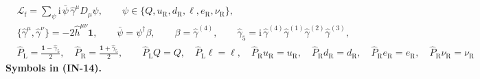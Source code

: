 \documentclass[
  10pt,
]{article}
\begin{document}
\[
\begin{aligned}
&\mathcal{L}_{\mathrm{f}} = \sum_{\psi}\mathrm{i}\,\bar\psi\,\hat\gamma^\mu D_\mu\psi,\qquad
 \psi \in \{Q, u_{\mathrm{R}}, d_{\mathrm{R}}, \ell, e_{\mathrm{R}}, \nu_{\mathrm{R}}\},\\
&\{\hat\gamma^\mu, \hat\gamma^\nu\} = -2\hat h^{\mu\nu}\mathbf{1},\qquad \bar\psi = \psi^\dagger\beta,\qquad
 \beta = \hat\gamma^{(4)},\qquad \hat\gamma_5 = \mathrm{i}\,\hat\gamma^{(4)}\hat\gamma^{(1)}\hat\gamma^{(2)}\hat\gamma^{(3)},\\
&\hat P_{\mathrm{L}} = \frac{\mathbf{1} - \hat\gamma_5}{2},\quad \hat P_{\mathrm{R}} = \frac{\mathbf{1} + \hat\gamma_5}{2},\qquad
 \hat P_{\mathrm{L}}Q = Q,\quad \hat P_{\mathrm{L}}\ell = \ell,\quad \hat P_{\mathrm{R}}u_{\mathrm{R}} = u_{\mathrm{R}},\quad
 \hat P_{\mathrm{R}}d_{\mathrm{R}} = d_{\mathrm{R}},\quad \hat P_{\mathrm{R}}e_{\mathrm{R}} = e_{\mathrm{R}},\quad
 \hat P_{\mathrm{R}}\nu_{\mathrm{R}} = \nu_{\mathrm{R}}
\end{aligned} \tag{IN-14}
\] \textbf{Symbols in (IN-14).}
\end{document}
